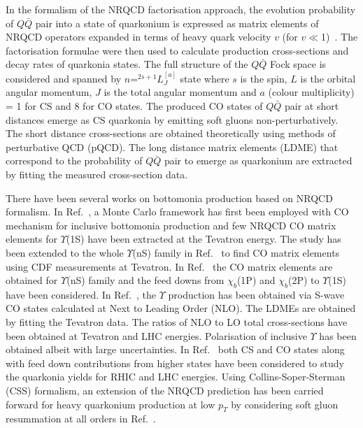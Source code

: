 In the formalism of the NRQCD factorisation approach, the evolution probability of $Q\bar{Q}$
pair into a state of quarkonium is expressed as matrix elements of NRQCD operators expanded
in terms of heavy quark velocity $v$ (for $v\ll$1)~\cite{Bodwin:1994jh}.
The factorisation formulae were then used to calculate production cross-sections
and decay rates of quarkonia states.
The full structure of the $Q\bar{Q}$ Fock space
is considered and spanned by $n$=$^{2s+1}L_J^{[a]}$ state where $s$
is the spin, $L$ is the orbital angular momentum, $J$ is the total angular momentum
and $a$ (colour multiplicity) = 1 for CS and 8 for CO states. 
The produced CO states of $Q\bar{Q}$ pair at short distances emerge as 
CS quarkonia by emitting soft gluons non-perturbatively.
The short distance cross-sections are obtained theoretically
using methods of perturbative QCD (pQCD). The long distance matrix elements
(LDME) that correspond to the probability of 
$Q\bar{Q}$ pair to emerge as quarkonium are extracted by fitting the measured cross-section
data.

There have been several works on bottomonia production based on
NRQCD formalism. In Ref.~\cite{Domenech:1999qg}, a Monte Carlo framework has first
been employed with CO mechanism for inclusive bottomonia production and few
NRQCD CO matrix elements for $\Upsilon$(1S) have been extracted at the Tevatron energy. 
The study has been extended to the whole $\Upsilon$(nS) family in Ref.~\cite{Domenech:2000ri}
to find CO matrix elements using CDF measurements at Tevatron.
In Ref.~\cite{Brateen:PRD2001} the CO matrix elements are obtained for $\Upsilon$(nS) family
and the feed downs from $\chi_{b}$(1P) and $\chi_{b}$(2P) to $\Upsilon$(1S) have been 
considered.
In Ref.~\cite{Gong:2010bk}, the $\Upsilon$ production has been obtained via
S-wave CO states calculated at Next to Leading Order (NLO). The LDMEs are obtained
by fitting the Tevatron data. The ratios of NLO to LO total cross-sections
have been obtained at Tevatron and LHC energies. Polarisation of inclusive
$\Upsilon$ has been obtained albeit with large uncertainties.
In Ref.~\cite{Sharma:2012dy} both CS and CO states along with
feed down contributions from higher states have been considered to study the
quarkonia yields for RHIC and LHC energies.
Using Collins-Soper-Sterman (CSS) formalism, an extension of the NRQCD prediction
has been carried forward for heavy quarkonium production
at low $p_T$ by considering soft gluon resummation at all orders in Ref.~\cite{Sun:2012vc}.

